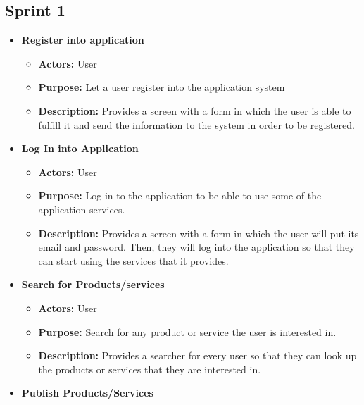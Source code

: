 \documentclass[./main.tex]{subfiles}
\begin{document}
\subsection{Sprint 1}
\begin{itemize}

\item
  \textbf{Register into application}

  \begin{itemize}
  
  \item
    \textbf{Actors:} User
  \item
    \textbf{Purpose:} Let a user register into the application system
  \item
    \textbf{Description:} Provides a screen with a form in which the
    user is able to fulfill it and send the information to the system in
    order to be registered.
  \end{itemize}
\item
  \textbf{Log In into Application}

  \begin{itemize}
  
  \item
    \textbf{Actors:} User
  \item
    \textbf{Purpose:} Log in to the application to be able to use some
    of the application services.
  \item
    \textbf{Description:} Provides a screen with a form in which the
    user will put its email and password. Then, they will log into the
    application so that they can start using the services that it provides.
  \end{itemize}
\item
  \textbf{Search for Products/services}

  \begin{itemize}
  
  \item
    \textbf{Actors:} User
  \item
    \textbf{Purpose:} Search for any product or service the user is
    interested in.
  \item
    \textbf{Description:} Provides a searcher for every user so that
    they can look up the products or services that they are interested
    in.
  \end{itemize}
\item
  \textbf{Publish Products/Services}

  \begin{itemize}
  

\end{itemize}
\end{itemize}
\end{document}
